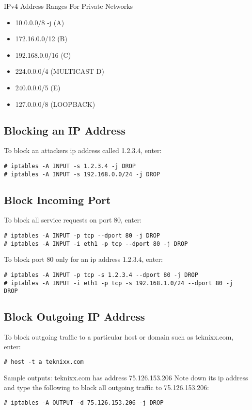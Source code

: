 \documentclass[dvipdfm]{book}
\begin{document}
IPv4 Address Ranges For Private Networks
\begin{itemize}
\item 10.0.0.0/8 -j (A)
\item 172.16.0.0/12 (B)
\item 192.168.0.0/16 (C)
\item 224.0.0.0/4 (MULTICAST D)
\item 240.0.0.0/5 (E)
\item 127.0.0.0/8 (LOOPBACK)
\end{itemize}

\subsection{Blocking an IP Address}

To block an attackers ip address called 1.2.3.4, enter:
\begin{verbatim}
# iptables -A INPUT -s 1.2.3.4 -j DROP
# iptables -A INPUT -s 192.168.0.0/24 -j DROP
\end{verbatim}

\subsection{Block Incoming Port}

To block all service requests on port 80, enter:
\begin{verbatim}
# iptables -A INPUT -p tcp --dport 80 -j DROP
# iptables -A INPUT -i eth1 -p tcp --dport 80 -j DROP
\end{verbatim}

To block port 80 only for an ip address 1.2.3.4, enter:
\begin{verbatim}
# iptables -A INPUT -p tcp -s 1.2.3.4 --dport 80 -j DROP
# iptables -A INPUT -i eth1 -p tcp -s 192.168.1.0/24 --dport 80 -j DROP
\end{verbatim}

\subsection{Block Outgoing IP Address}

To block outgoing traffic to a particular host or domain 
such as teknixx.com, enter:
\begin{verbatim}
# host -t a teknixx.com
\end{verbatim}

Sample outputs:
teknixx.com has address 75.126.153.206
Note down its ip address and type the following to block 
all outgoing traffic to 75.126.153.206:
\begin{verbatim}
# iptables -A OUTPUT -d 75.126.153.206 -j DROP
\end{verbatim}
\end{document}
